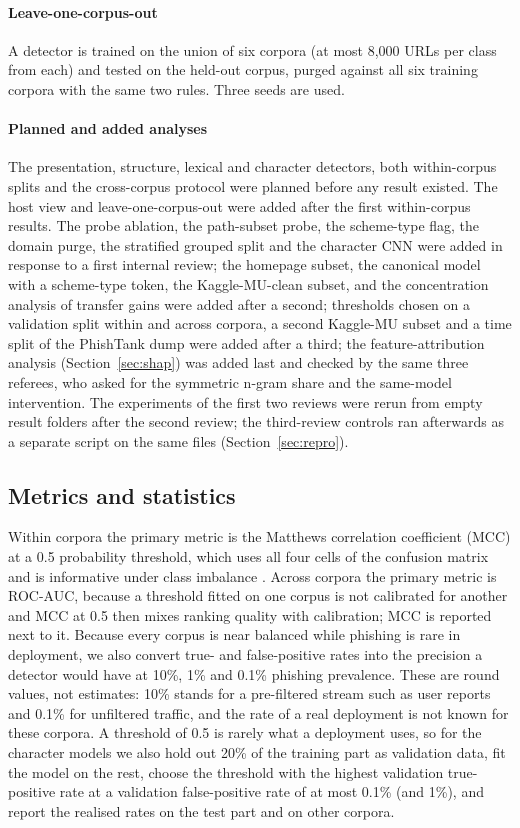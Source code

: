 \paragraph{Leave-one-corpus-out} A detector is trained on the union of six corpora (at most 8,000 URLs per class from each) and tested on the held-out corpus, purged against all six training corpora with the same two rules. Three seeds are used.

\paragraph{Planned and added analyses} The presentation, structure, lexical and character detectors, both within-corpus splits and the cross-corpus protocol were planned before any result existed. The host view and leave-one-corpus-out were added after the first within-corpus results. The probe ablation, the path-subset probe, the scheme-type flag, the domain purge, the stratified grouped split and the character CNN were added in response to a first internal review; the homepage subset, the canonical model with a scheme-type token, the Kaggle-MU-clean subset, and the concentration analysis of transfer gains were added after a second; thresholds chosen on a validation split within and across corpora, a second Kaggle-MU subset and a time split of the PhishTank dump were added after a third; the feature-attribution analysis (Section~\ref{sec:shap}) was added last and checked by the same three referees, who asked for the symmetric n-gram share and the same-model intervention. The experiments of the first two reviews were rerun from empty result folders after the second review; the third-review controls ran afterwards as a separate script on the same files (Section~\ref{sec:repro}).

\subsection{Metrics and statistics}
Within corpora the primary metric is the Matthews correlation coefficient (MCC) at a 0.5 probability threshold, which uses all four cells of the confusion matrix and is informative under class imbalance \citep{chicco2020}. Across corpora the primary metric is ROC-AUC, because a threshold fitted on one corpus is not calibrated for another and MCC at 0.5 then mixes ranking quality with calibration; MCC is reported next to it. Because every corpus is near balanced while phishing is rare in deployment, we also convert true- and false-positive rates into the precision a detector would have at 10\%, 1\% and 0.1\% phishing prevalence. These are round values, not estimates: 10\% stands for a pre-filtered stream such as user reports and 0.1\% for unfiltered traffic, and the rate of a real deployment is not known for these corpora. A threshold of 0.5 is rarely what a deployment uses, so for the character models we also hold out 20\% of the training part as validation data, fit the model on the rest, choose the threshold with the highest validation true-positive rate at a validation false-positive rate of at most 0.1\% (and 1\%), and report the realised rates on the test part and on other corpora.

